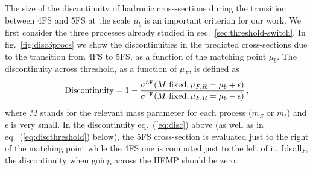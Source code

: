 \documentclass[letter,11pt]{article}
\def\mub{\mu_b}
\begin{document}
The size of the discontinuity of hadronic cross-sections during the transition between 4FS and 5FS at the scale $\mub$ is an important criterion for our work. We first consider the three processes already studied in sec.~\ref{sec:threshold-switch}. In fig.~\ref{fig:disc3procs} we show the discontinuities in the predicted cross-sections due to the transition from 4FS to 5FS, as a function of the matching point $\mub$. The discontinuity across threshold, as a function of $\mu_F$, is defined as 
%
\begin{equation}
{\rm Discontinuity} = 1 - \frac{\sigma^{\rm 5F}(M~{\rm fixed}, \mu_{F,R}=\mub+\epsilon)}{\sigma^{\rm 4F}(M~{\rm fixed}, \mu_{F,R}=\mub-\epsilon)} \,,
\label{eq:disc}
\end{equation}
%
where $M$ stands for the relevant mass parameter for each process ($m_Z$ or $m_t$) and $\epsilon$ is very small. In the discontinuity eq.~(\ref{eq:disc}) above (as well as in eq.~(\ref{eq:discthreshold}) below), the 5FS cross-section is evaluated just to the right of the matching point while the 4FS one is computed just to the left of it. Ideally, the discontinuity when going across the HFMP should be zero.
\end{document}
